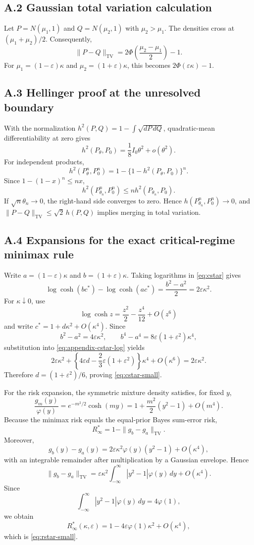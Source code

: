 \documentclass[11pt]{article}
\theoremstyle{remark}
\begin{document}
\subsection*{A.2 Gaussian total variation calculation}

Let $P=N(\mu_1,1)$ and $Q=N(\mu_2,1)$ with $\mu_2>\mu_1$. The densities cross at $(\mu_1+\mu_2)/2$. Consequently,
\[
\|P-Q\|_{\mathrm{TV}}
=
2\Phi\left(\frac{\mu_2-\mu_1}{2}\right)-1.
\]
For $\mu_1=(1-\varepsilon)\kappa$ and $\mu_2=(1+\varepsilon)\kappa$, this becomes $2\Phi(\varepsilon\kappa)-1$.

\subsection*{A.3 Hellinger proof at the unresolved boundary}

With the normalization $h^2(P,Q)=1-\int\sqrt{dP\,dQ}$, quadratic-mean differentiability at zero gives
\[
h^2(P_\theta,P_0)=\frac18I_0\theta^2+o(\theta^2).
\]
For independent products,
\[
h^2(P_\theta^n,P_0^n)=1-\{1-h^2(P_\theta,P_0)\}^n.
\]
Since $1-(1-x)^n\le nx$,
\[
h^2(P_{\theta_n}^n,P_0^n)
\le
n h^2(P_{\theta_n},P_0).
\]
If $\sqrt n\theta_n\to0$, the right-hand side converges to zero. Hence $h(P_{\theta_n}^n,P_0^n)\to0$, and $\|P-Q\|_{\mathrm{TV}}\le\sqrt2\,h(P,Q)$ implies merging in total variation.

\subsection*{A.4 Expansions for the exact critical-regime minimax rule}

Write $a=(1-\varepsilon)\kappa$ and $b=(1+\varepsilon)\kappa$. Taking logarithms in \eqref{eq:cstar} gives
\begin{equation}
\log\cosh(bc^*)-\log\cosh(ac^*)
=\frac{b^2-a^2}{2}
=2\varepsilon\kappa^2.
\label{eq:appendix-cstar-log}
\end{equation}
For $\kappa\downarrow0$, use
\[
\log\cosh z=\frac{z^2}{2}-\frac{z^4}{12}+O(z^6)
\]
and write $c^*=1+d\kappa^2+O(\kappa^4)$. Since
\[
b^2-a^2=4\varepsilon\kappa^2,
\qquad
b^4-a^4=8\varepsilon(1+\varepsilon^2)\kappa^4,
\]
substitution into \eqref{eq:appendix-cstar-log} yields
\[
2\varepsilon\kappa^2
+\left\{4\varepsilon d-\frac{2}{3}\varepsilon(1+\varepsilon^2)\right\}\kappa^4
+O(\kappa^6)
=2\varepsilon\kappa^2.
\]
Therefore $d=(1+\varepsilon^2)/6$, proving \eqref{eq:cstar-small}.

For the risk expansion, the symmetric mixture density satisfies, for fixed $y$,
\[
\frac{g_m(y)}{\varphi(y)}
=e^{-m^2/2}\cosh(my)
=1+\frac{m^2}{2}(y^2-1)+O(m^4).
\]
Because the minimax risk equals the equal-prior Bayes sum-error risk,
\[
R_\infty^*=1-\|g_b-g_a\|_{\mathrm{TV}}.
\]
Moreover,
\[
g_b(y)-g_a(y)
=2\varepsilon\kappa^2\varphi(y)(y^2-1)+O(\kappa^4),
\]
with an integrable remainder after multiplication by a Gaussian envelope. Hence
\[
\|g_b-g_a\|_{\mathrm{TV}}
=\varepsilon\kappa^2
\int_{-\infty}^{\infty}|y^2-1|\varphi(y)\,dy
+O(\kappa^4).
\]
Since
\[
\int_{-\infty}^{\infty}|y^2-1|\varphi(y)\,dy=4\varphi(1),
\]
we obtain
\[
R_\infty^*(\kappa,\varepsilon)
=1-4\varepsilon\varphi(1)\kappa^2+O(\kappa^4),
\]
which is \eqref{eq:rstar-small}.
\end{document}
